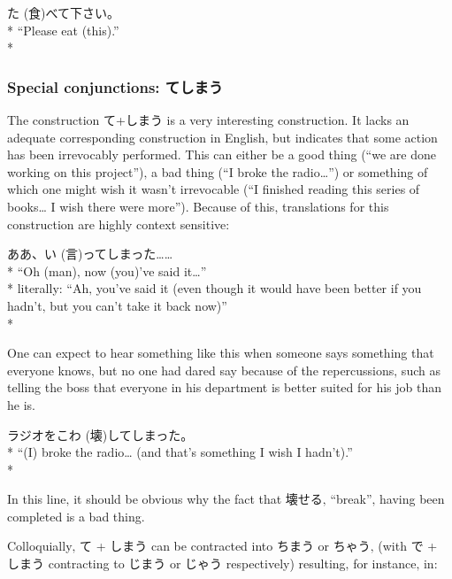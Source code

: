 \documentclass[11pt, b5paper, twoside, openright, onecolumn]{book}
\makeatletter
\newcommand*{\rubystack}[2]{{\relscale{0.5}%
  \begin{tabular}[b]{@{}c@{}}%
    {#1}\\%
   {\textscale{2}{#2}}%
  \end{tabular}}%
}
\DeclareRobustCommand*{\ruby}[2]{%
  \mbox{%
    \setlength{\parskip}{0ex}%
    \BeginAccSupp{method=pdfstringdef,ActualText={#1}}%
      \rubystack{\phantom{#2}}{#1}%
      \llap{%
        \rubystack{#2}{\phantom{#1}}%
      }%
    \EndAccSupp{}%
  }%
}
\renewcommand*{\ruby}[2]{#2 (#1)}%
\newenvironment{exampleblock}{
\setlength{\parindent}{0.6in}
\begin{minipage}[t]{\dimexpr\textwidth-\parindent}}
{\end{minipage}}
\makeatother
\begin{document}
\begin{exampleblock}
\ruby{食}{た}べて下さい。 \\* 
“Please eat (this).” \\* 
\end{exampleblock}
\subsubsection{Special conjunctions: てしまう}


The construction て+しまう is a very interesting construction. It lacks an adequate corresponding construction in English‚ but indicates that some action has been irrevocably performed. This can either be a good thing (“we are done working on this project”)‚ a bad thing (“I broke the radio…”) or something of which one might wish it wasn’t irrevocable (“I finished reading this series of books… I wish there were more”). Because of this‚ translations for this construction are highly context sensitive:

\vspace{0.4cm}
\begin{exampleblock}
ああ、\ruby{言}{い}ってしまった…… \\* 
“Oh (man)‚ now (you)’ve said it…” \\* 
literally: “Ah‚ you’ve said it (even though it would have been better if you hadn’t‚ but you can’t take it back now)” \\* 
\end{exampleblock}
\vspace{0.2cm}

One can expect to hear something like this when someone says something that everyone knows‚ but no one had dared say because of the repercussions‚ such as telling the boss that everyone in his department is better suited for his job than he is.

\vspace{0.4cm}
\begin{exampleblock}
ラジオを\ruby{壊}{こわ}してしまった。 \\* 
“(I) broke the radio… (and that’s something I wish I hadn’t).” \\* 
\end{exampleblock}
\vspace{0.2cm}

In this line‚ it should be obvious why the fact that 壊せる‚ “break”‚ having been completed is a bad thing.

Colloquially‚ て + しまう can be contracted into ちまう or ちゃう‚ (with で + しまう contracting to じまう or じゃう respectively) resulting‚ for instance‚ in:
\end{document}
